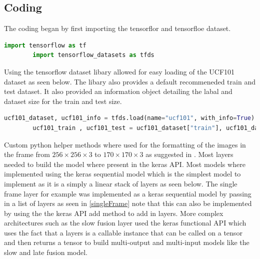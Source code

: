 \documentclass[10pt,phd,a4paper,oneside]{article}
\begin{document}
    \subsection{Coding}

    The coding began by first importing the tensorflor and tensorfloe dataset.

    \begin{lstlisting}[language=Python, caption=Importing tensorflow libaries]
        import tensorflow as tf
        import tensorflow_datasets as tfds
    \end{lstlisting}

    Using the tensorflow dataset libary allowed for easy loading of the UCF101 dataset as seen below. The libary also provides a default recommeneded train and test dataset. It also provided an information object detailing the labal and dataset size for the train and test size.

    \begin{lstlisting}[language=Python, caption=Loading UCF101 dataset]
        ucf101_dataset, ucf101_info = tfds.load(name="ucf101", with_info=True)
        ucf101_train , ucf101_test = ucf101_dataset["train"], ucf101_dataset["test"]
    \end{lstlisting}


    Custom python helper methods where used for the formatting of the images in the frame from $256 \times 256 \times 3$ to $170 \times170 \times 3$ as suggested in \citep{KarpathyCVPR14}. Most layers needed to build the model where present in the keras API. Most models where implemented using the keras sequential model which is the simplest model to implement as it is a simply a linear stack of layers as seen below. The single frame layer for example was implemented as a keras sequential model by passing in a list of layers as seen in \ref{singleFrame} note that this can also be implemented by using the the keras API add method to add in layers. More complex architectures such as the slow fusion layer used the keras functional API which uses the fact that a layers is a callable instance that can be called on a tensor and then returns a tensor to build multi-output and multi-input models like the slow and late fusion model.
\end{document}
